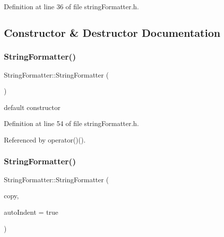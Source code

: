 Definition at line 36 of file string\+Formatter.\+h.



\subsection{Constructor \& Destructor Documentation}
\mbox{\label{classStringFormatter_a44a72490b89aaddafecedfb48e1613ff}} 
\subsubsection{\texorpdfstring{String\+Formatter()}{StringFormatter()}\hspace{0.1cm}{\footnotesize\ttfamily [1/3]}}
{\footnotesize\ttfamily String\+Formatter\+::\+String\+Formatter (\begin{DoxyParamCaption}{ }\end{DoxyParamCaption})\hspace{0.3cm}{\ttfamily [inline]}}

default constructor 

Definition at line 54 of file string\+Formatter.\+h.



Referenced by operator()().

\mbox{\label{classStringFormatter_a5ad14c57a78febf7f120fb867cb25680}} 
\subsubsection{\texorpdfstring{String\+Formatter()}{StringFormatter()}\hspace{0.1cm}{\footnotesize\ttfamily [2/3]}}
{\footnotesize\ttfamily String\+Formatter\+::\+String\+Formatter (\begin{DoxyParamCaption}\item[{const \hyperlink{classStringFormatter}{String\+Formatter} \&}]{copy,  }\item[{const bool \&}]{auto\+Indent = {\ttfamily true} }\end{DoxyParamCaption})\hspace{0.3cm}{\ttfamily [inline]}}

